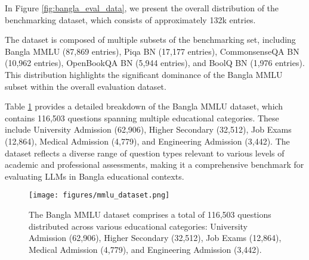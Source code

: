 In Figure \ref{fig:bangla_eval_data}, we present the overall distribution of the benchmarking dataset, which consists of approximately 132k entries. 


The dataset is composed of multiple subsets of the benchmarking set, including Bangla MMLU (87,869 entries), Piqa BN (17,177 entries), CommonsenseQA BN (10,962 entries), OpenBookQA BN (5,944 entries), and BoolQ BN (1,976 entries). This distribution highlights the significant dominance of the Bangla MMLU subset within the overall evaluation dataset.

Table \ref{fig:bangla_mmlu_data} provides a detailed breakdown of the Bangla MMLU dataset, which contains 116,503 questions spanning multiple educational categories. These include University Admission (62,906), Higher Secondary (32,512), Job Exams (12,864), Medical Admission (4,779), and Engineering Admission (3,442). The dataset reflects a diverse range of question types relevant to various levels of academic and professional assessments, making it a comprehensive benchmark for evaluating LLMs in Bangla educational contexts.


\begin{figure}[htb!]
  \centering
  \texttt{[image: figures/mmlu\_dataset.png]}
  \caption{The Bangla MMLU dataset comprises a total of 116,503 questions distributed across various educational categories: University Admission (62,906), Higher Secondary (32,512), Job Exams (12,864), Medical Admission (4,779), and Engineering Admission (3,442).}
  \label{fig:bangla_mmlu_data}
  \vspace{-0.3cm}
\end{figure}


